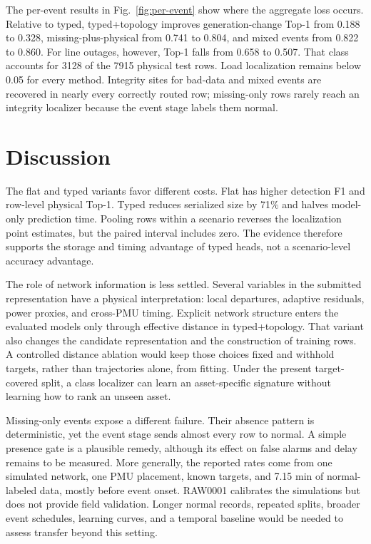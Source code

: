 \documentclass[conference]{IEEEtran}
\begin{document}
The per-event results in Fig.~\ref{fig:per-event} show where the aggregate loss occurs. Relative to typed, typed+topology improves generation-change Top-1 from 0.188 to 0.328, missing-plus-physical from 0.741 to 0.804, and mixed events from 0.822 to 0.860. For line outages, however, Top-1 falls from 0.658 to 0.507. That class accounts for 3128 of the 7915 physical test rows. Load localization remains below 0.05 for every method. Integrity sites for bad-data and mixed events are recovered in nearly every correctly routed row; missing-only rows rarely reach an integrity localizer because the event stage labels them normal.

\section{Discussion}
The flat and typed variants favor different costs. Flat has higher detection F1 and row-level physical Top-1. Typed reduces serialized size by 71\% and halves model-only prediction time. Pooling rows within a scenario reverses the localization point estimates, but the paired interval includes zero. The evidence therefore supports the storage and timing advantage of typed heads, not a scenario-level accuracy advantage.

The role of network information is less settled. Several variables in the submitted representation have a physical interpretation: local departures, adaptive residuals, power proxies, and cross-PMU timing. Explicit network structure enters the evaluated models only through effective distance in typed+topology. That variant also changes the candidate representation and the construction of training rows. A controlled distance ablation would keep those choices fixed and withhold targets, rather than trajectories alone, from fitting. Under the present target-covered split, a class localizer can learn an asset-specific signature without learning how to rank an unseen asset.

Missing-only events expose a different failure. Their absence pattern is deterministic, yet the event stage sends almost every row to normal. A simple presence gate is a plausible remedy, although its effect on false alarms and delay remains to be measured. More generally, the reported rates come from one simulated network, one PMU placement, known targets, and 7.15 min of normal-labeled data, mostly before event onset. RAW0001 calibrates the simulations but does not provide field validation. Longer normal records, repeated splits, broader event schedules, learning curves, and a temporal baseline would be needed to assess transfer beyond this setting.
\end{document}
